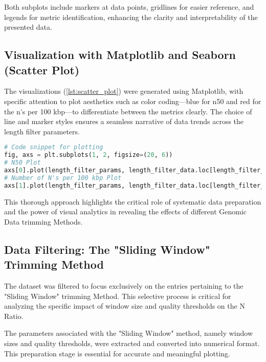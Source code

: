 Both subplots include markers at data points, gridlines for easier reference, and legends for metric identification, enhancing the clarity and interpretability of the presented data.

\subsection{Visualization with Matplotlib and Seaborn (Scatter Plot)} \label{sec:length_filter_trimming_visualisation}
The visualizations (\autoref{lst:scatter_plot}) were generated using Matplotlib, with specific attention to plot aesthetics such as color coding—blue for \gls{n50} and red for the \gls{n's per 100 kbp}—to differentiate between the \gls{metrics} clearly. The choice of line and marker styles ensures a seamless narrative of data trends across the length filter parameters.

\begin{lstlisting}[language=Python, label={lst:scatter_plot}, caption=Scatter Plot Visualization of Metrics Variation]
# Code snippet for plotting
fig, axs = plt.subplots(1, 2, figsize=(20, 6))
# N50 Plot
axs[0].plot(length_filter_params, length_filter_data.loc[length_filter_sorted, 'N50'], marker='o', linestyle='-', color='blue', label='N50')
# Number of N's per 100 kbp Plot
axs[1].plot(length_filter_params, length_filter_data.loc[length_filter_sorted, "# N's per 100 kbp"], marker='o', linestyle='-', color='red', label="# N's per 100 kbp")
\end{lstlisting}

This thorough approach highlights the critical role of systematic data preparation and the power of visual analytics in revealing the effects of different Genomic Data \gls{trimming} Methods.





\subsection{Data Filtering: The "Sliding Window" Trimming Method} \label{sec:sliding_window_trimming}
The dataset was filtered to focus exclusively on the entries pertaining to the "Sliding Window" \gls{trimming} Method. This selective process is critical for analyzing the specific impact of window size and quality thresholds on the N Ratio.

The parameters associated with the "Sliding Window" method, namely window sizes and quality thresholds, were extracted and converted into numerical format. This preparation stage is essential for accurate and meaningful plotting.

